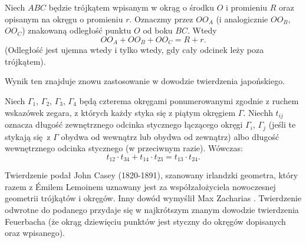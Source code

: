 \begin{theorem}[Carnot, 1803?]
    Niech $ABC$ będzie trójkątem wpisanym w okrąg o środku $O$ i promieniu $R$ oraz opisanym na okręgu o promieniu $r$.
    Oznaczmy przez $OO_A$ (i analogicznie $OO_B$, $OO_C$) znakowaną odległość punktu $O$ od boku $BC$.
    Wtedy 
    \begin{equation}
        OO_A + OO_B + OO_C = R + r.
    \end{equation}
    (Odległość jest ujemna wtedy i tylko wtedy, gdy cały odcinek leży poza trójkątem).
\end{theorem}

Wynik ten znajduje znowu zastosowanie w dowodzie twierdzenia japońskiego.

\begin{theorem}[Caseya, 1866]
%
    Niech $\Gamma_1$, $\Gamma_2$, $\Gamma_3$, $\Gamma_4$ będą czterema okręgami ponumerowanymi zgodnie z ruchem wskazówek zegara, z których każdy styka się z piątym okręgiem $\Gamma$.
    Niechh $t_{ij}$ oznacza długość zewnętrznego odcinka stycznego łączącego okręgi $\Gamma_i$, $\Gamma_j$ (jeśli te stykają się z $\Gamma$ obydwa od wewnątrz lub obydwa od zewnątrz) albo długość wewnętrznego odcinka stycznego (w przeciwnym razie).
    Wówczas:
    \begin{equation}
        t_{12} \cdot t_{34} + t_{14} \cdot t_{23} = t_{13} \cdot t_{24}.
    \end{equation}
\end{theorem}

Twierdzenie podał John Casey (1820-1891), szanowany irlandzki geometra, który razem z Émilem Lemoinem uznawany jest za współzałożyciela nowoczesnej geometrii trójkątów i okręgów.
%
Inny dowód wymyślił Max Zacharias \cite{zacharias_1942}.
Twierdzenie odwrotne do podanego przydaje się w najkrótszym znanym dowodzie twierdzenia Feuerbacha (że okrąg dziewięciu punktów jest styczny do okręgów dopisanych oraz wpisanego).

%